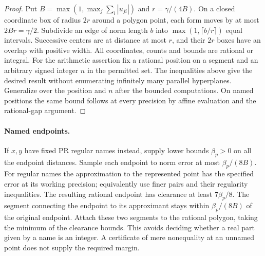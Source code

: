 \begin{proof}
Put $B=\max(1,\max_j\sum_i |u_{ji}|)$ and $r=\gamma/(4B)$. On a closed coordinate box of radius $2r$ around a polygon point, each form moves by at most $2Br=\gamma/2$. Subdivide an edge of norm length $b$ into $\max(1,\lceil b/r\rceil)$ equal intervals. Successive centers are at distance at most $r$, and their $2r$ boxes have an overlap with positive width. All coordinates, counts and bounds are rational or integral. For the arithmetic assertion fix a rational position on a segment and an arbitrary signed integer $n$ in the permitted set. The inequalities above give the desired result without enumerating infinitely many parallel hyperplanes. Generalize over the position and $n$ after the bounded computations. On named positions the same bound follows at every precision by affine evaluation and the rational-gap argument.
\end{proof}

\paragraph{Named endpoints.}
If $x,y$ have fixed PR regular names instead, supply lower bounds $\beta_p>0$ on all the endpoint distances. Sample each endpoint to norm error at most $\beta_p/(8B)$. For regular names the approximation to the represented point has the specified error at its working precision; equivalently use finer pairs and their regularity inequalities. The resulting rational endpoint has clearance at least $7\beta_p/8$. The segment connecting the endpoint to its approximant stays within $\beta_p/(8B)$ of the original endpoint. Attach these two segments to the rational polygon, taking the minimum of the clearance bounds. This avoids deciding whether a real part given by a name is an integer. A certificate of mere nonequality at an unnamed point does not supply the required margin.

